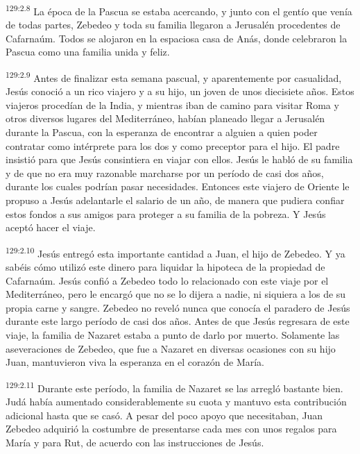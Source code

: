 \par 
\textsuperscript{129:2.8} La época de la Pascua se estaba acercando, y junto con el gentío que venía de todas partes, Zebedeo y toda su familia llegaron a Jerusalén procedentes de Cafarnaúm. Todos se alojaron en la espaciosa casa de Anás, donde celebraron la Pascua como una familia unida y feliz.

\par 
\textsuperscript{129:2.9} Antes de finalizar esta semana pascual, y aparentemente por casualidad, Jesús conoció a un rico viajero y a su hijo, un joven de unos diecisiete años. Estos viajeros procedían de la India, y mientras iban de camino para visitar Roma y otros diversos lugares del Mediterráneo, habían planeado llegar a Jerusalén durante la Pascua, con la esperanza de encontrar a alguien a quien poder contratar como intérprete para los dos y como preceptor para el hijo. El padre insistió para que Jesús consintiera en viajar con ellos. Jesús le habló de su familia y de que no era muy razonable marcharse por un período de casi dos años, durante los cuales podrían pasar necesidades. Entonces este viajero de Oriente le propuso a Jesús adelantarle el salario de un año, de manera que pudiera confiar estos fondos a sus amigos para proteger a su familia de la pobreza. Y Jesús aceptó hacer el viaje.

\par 
\textsuperscript{129:2.10} Jesús entregó esta importante cantidad a Juan, el hijo de Zebedeo. Y ya sabéis cómo utilizó este dinero para liquidar la hipoteca de la propiedad de Cafarnaúm. Jesús confió a Zebedeo todo lo relacionado con este viaje por el Mediterráneo, pero le encargó que no se lo dijera a nadie, ni siquiera a los de su propia carne y sangre. Zebedeo no reveló nunca que conocía el paradero de Jesús durante este largo período de casi dos años. Antes de que Jesús regresara de este viaje, la familia de Nazaret estaba a punto de darlo por muerto. Solamente las aseveraciones de Zebedeo, que fue a Nazaret en diversas ocasiones con su hijo Juan, mantuvieron viva la esperanza en el corazón de María.

\par 
\textsuperscript{129:2.11} Durante este período, la familia de Nazaret se las arregló bastante bien. Judá había aumentado considerablemente su cuota y mantuvo esta contribución adicional hasta que se casó. A pesar del poco apoyo que necesitaban, Juan Zebedeo adquirió la costumbre de presentarse cada mes con unos regalos para María y para Rut, de acuerdo con las instrucciones de Jesús.

